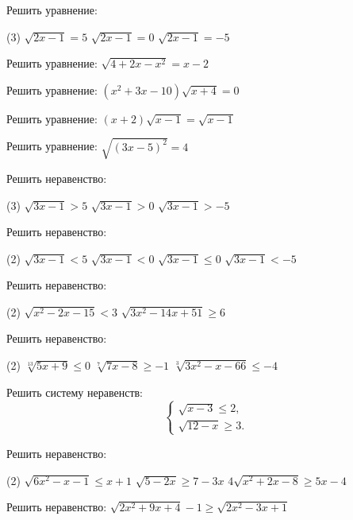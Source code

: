 \begin{class}[number=3]
	\begin{listofex}
		\item Решить уравнение:
		\begin{tasks}(3)
			\task \( \sqrt{2x-1}=5 \)
			\task \( \sqrt{2x-1}=0 \)
			\task \( \sqrt{2x-1}=-5 \)
		\end{tasks}
		\item Решить уравнение: \( \sqrt{4+2x-x^2}=x-2 \)
		\item Решить уравнение: \( (x^2+3x-10)\sqrt{x+4}=0 \)
		\item Решить уравнение: \( (x+2)\sqrt{x-1}=\sqrt{x-1} \)
		\item Решить уравнение: \( \sqrt{(3x-5)^2}=4 \)
		\item Решить неравенство:
		\begin{tasks}(3)
			\task \( \sqrt{3x-1}>5 \)
			\task \( \sqrt{3x-1}>0 \)
			\task \( \sqrt{3x-1}>-5 \)
		\end{tasks}
		\item Решить неравенство:
		\begin{tasks}(2)
			\task \( \sqrt{3x-1}<5 \)
			\task \( \sqrt{3x-1}<0 \)
			\task \( \sqrt{3x-1}\le0 \)
			\task \( \sqrt{3x-1}<-5 \)
		\end{tasks}
		\item Решить неравенство:
		\begin{tasks}(2)
			\task \( \sqrt{x^2-2x-15}<3 \)
			\task \( \sqrt{3x^2-14x+51}\ge6 \)
		\end{tasks}
		\item Решить неравенство:
		\begin{tasks}(2)
			\task \( \sqrt[13]{5x+9}\le0 \)
			\task \( \sqrt[7]{7x-8}\ge-1 \)
			\task \( \sqrt[3]{3x^2-x-66}\le-4 \)
		\end{tasks}
		\item Решить систему неравенств:
		\[ \left\{
		\begin{array}{l}
			\sqrt{x-3}\le2,\\
			\sqrt{12-x}\ge3.
		\end{array}
		\right. \]
		\item Решить неравенство:
		\begin{tasks}(2)
			\task \( \sqrt{6x^2-x-1}\le x+1 \)
			\task \( \sqrt{5-2x}\ge 7-3x \)
			\task \( 4\sqrt{x^2+2x-8}\ge 5x-4 \)
		\end{tasks}
		\item Решить неравенство: \( \sqrt{2x^2+9x+4}-1\ge\sqrt{2x^2-3x+1} \)

\end{listofex}
\end{class}
